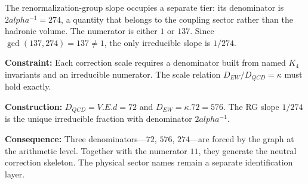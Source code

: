 \documentclass[11pt,a4paper]{book}
\def\alpha{alpha}%
\def\cdot{.}%
\def\mathrm#1{#1}%
\begin{document}
The renormalization-group slope occupies a separate tier: its
denominator is $2\alpha^{-1} = 274$, a quantity that belongs to the
coupling sector rather than the hadronic volume.  The numerator is
either $1$ or $137$.  Since $\gcd(137, 274) = 137 \neq 1$, the only
irreducible slope is $1/274$.

\textbf{Constraint:}
Each correction scale requires a denominator built from named $K_4$
invariants and an irreducible numerator.  The scale relation
$D_{\mathrm{EW}} / D_{\mathrm{QCD}} = \kappa$ must hold exactly.

\textbf{Construction:}
$D_{\mathrm{QCD}} = V \cdot E \cdot d = 72$
and $D_{\mathrm{EW}} = \kappa \cdot 72 = 576$.  The RG slope $1/274$
is the unique irreducible fraction with denominator $2\alpha^{-1}$.

\textbf{Consequence:}
Three denominators---$72$, $576$, $274$---are forced by the graph at
the arithmetic level.  Together with the numerator $11$, they generate
the neutral correction skeleton.  The physical sector names remain a
separate identification layer.
\end{document}
